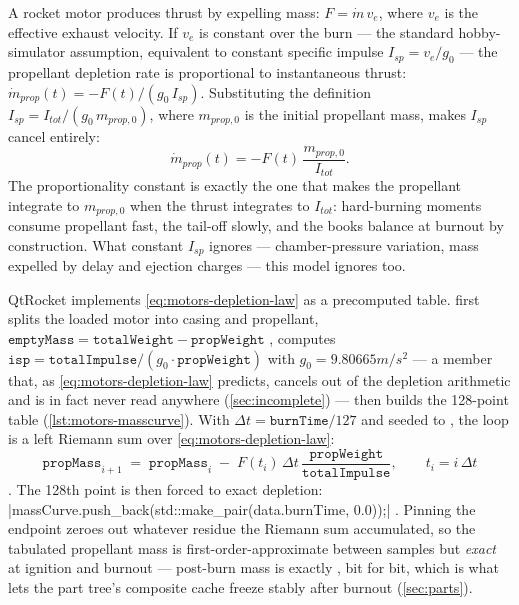 \begin{physbox}
A rocket motor produces thrust by expelling mass: $F = \dot{m}\,v_e$, where $v_e$ is the
effective exhaust velocity. If $v_e$ is constant over the burn --- the standard
hobby-simulator assumption, equivalent to constant specific impulse
$I_{sp} = v_e/g_0$ --- the propellant depletion rate is proportional to instantaneous
thrust: $\dot{m}_{prop}(t) = -F(t)/(g_0\,I_{sp})$. Substituting the definition
$I_{sp} = I_{tot}/(g_0\,m_{prop,0})$, where $m_{prop,0}$ is the initial propellant mass,
makes $I_{sp}$ cancel entirely:
\begin{equation}
\dot{m}_{prop}(t) = -F(t)\,\frac{m_{prop,0}}{I_{tot}}.
\label{eq:motors-depletion-law}
\end{equation}
The proportionality constant is exactly the one that makes the propellant integrate to
$m_{prop,0}$ when the thrust integrates to $I_{tot}$: hard-burning moments consume
propellant fast, the tail-off slowly, and the books balance at burnout by construction.
What constant $I_{sp}$ ignores --- chamber-pressure variation, mass expelled by delay and
ejection charges --- this model ignores too.
\end{physbox}

QtRocket implements \cref{eq:motors-depletion-law} as a precomputed table.
  first splits the loaded motor
into casing and propellant, $\mathtt{emptyMass} = \mathtt{totalWeight} -
\mathtt{propWeight}$ , computes
$\mathtt{isp} = \mathtt{totalImpulse}/(g_0\cdot\mathtt{propWeight})$ with
$g_0 = 9.80665\unit{m/s^2}$ 
 --- a member that, as \cref{eq:motors-depletion-law}
predicts, cancels out of the depletion arithmetic and is in fact never read anywhere
(\cref{sec:incomplete}) --- then builds the 128-point table
(\cref{lst:motors-masscurve}). With $\Delta t = \mathtt{burnTime}/127$
 and  seeded to 
, the loop is a left Riemann sum over
\cref{eq:motors-depletion-law}:
\begin{equation}
\mathtt{propMass}_{i+1} \;=\; \mathtt{propMass}_i \;-\;
F(t_i)\,\Delta t\,\frac{\mathtt{propWeight}}{\mathtt{totalImpulse}},
\qquad t_i = i\,\Delta t
\label{eq:motors-riemann}
\end{equation}
. The 128th point is then forced to exact depletion:
\cppinline|massCurve.push_back(std::make_pair(data.burnTime, 0.0));|
. Pinning the endpoint zeroes out whatever residue the
Riemann sum accumulated, so the tabulated propellant mass is first-order-approximate
between samples but \emph{exact} at ignition and burnout --- post-burn mass is exactly
, bit for bit, which is what lets the part tree's composite cache freeze
stably after burnout (\cref{sec:parts}).

